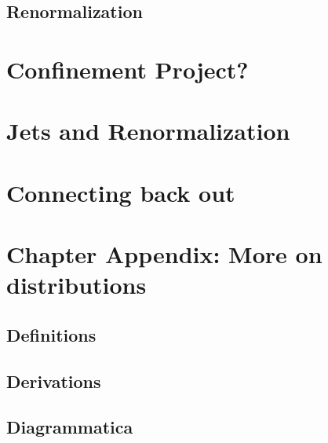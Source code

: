 \subsection{Renormalization}

\section{Confinement Project?}


\section{Jets and Renormalization}


\section{Connecting back out}

\section*{Chapter Appendix: More on distributions}

\subsection{Definitions}

\subsection{Derivations}

\subsection{Diagrammatica}


